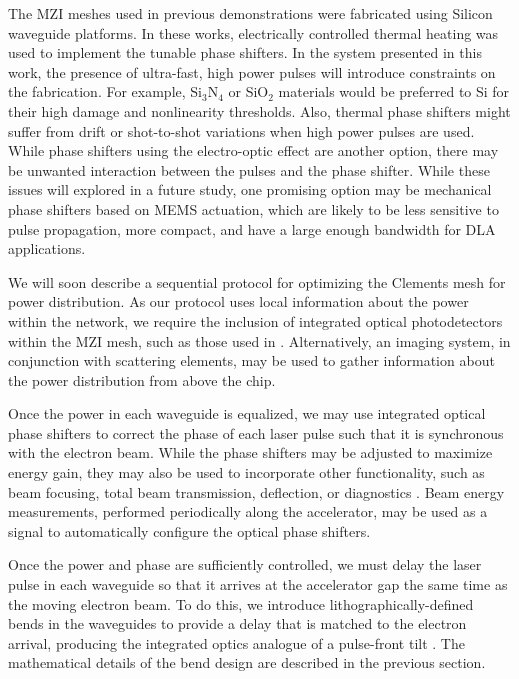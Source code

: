 The MZI meshes used in previous demonstrations \cite{Annoni2017, shen2017deep} were fabricated using Silicon waveguide platforms.  In these works, electrically controlled thermal heating was used to implement the tunable phase shifters.  In the system presented in this work, the presence of ultra-fast, high power pulses will introduce constraints on the fabrication.  For example, Si$_3$N$_4$ or SiO$_2$ materials would be preferred to Si for their high damage and nonlinearity thresholds.  Also, thermal phase shifters might suffer from drift or shot-to-shot variations when high power pulses are used.  While phase shifters using the electro-optic effect are another option, there may be unwanted interaction between the pulses and the phase shifter.  While these issues will explored in a future study, one promising option may be mechanical phase shifters \cite{han2015large} based on MEMS actuation, which are likely to be less sensitive to pulse propagation, more compact, and have a large enough bandwidth for DLA applications.

We will soon describe a sequential protocol for optimizing the Clements mesh for power distribution. As our protocol uses local information about the power within the network, we require the inclusion of integrated optical photodetectors within the MZI mesh, such as those used in \cite{Annoni2017}.  Alternatively, an imaging system, in conjunction with scattering elements, may be used to gather information about the power distribution from above the chip.

Once the power in each waveguide is equalized, we may use integrated optical phase shifters to correct the phase of each laser pulse such that it is synchronous with the electron beam. While the phase shifters may be adjusted to maximize energy gain, they may also be used to incorporate other functionality, such as beam focusing, total beam transmission, deflection, or diagnostics \cite{soong2014electron, ye2018deep}.  Beam energy measurements, performed periodically along the accelerator, may be used as a signal to automatically configure the optical phase shifters.

Once the power and phase are sufficiently controlled, we must delay the laser pulse in each waveguide so that it arrives at the accelerator gap the same time as the moving electron beam. To do this, we introduce lithographically-defined bends in the waveguides to provide a delay that is matched to the electron arrival, producing the integrated optics analogue of a pulse-front tilt \cite{cesar_optical_2018}. The mathematical details of the bend design are described in the previous section.

